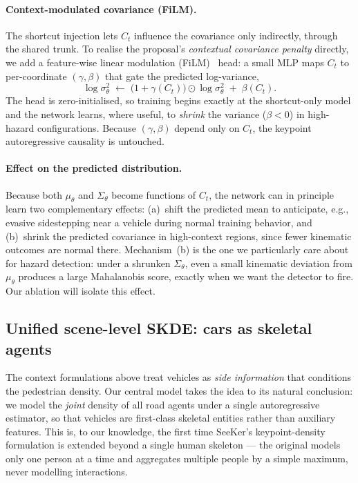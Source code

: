 \documentclass{article}
\begin{document}
\paragraph{Context-modulated covariance (FiLM).}
The shortcut injection lets $C_t$ influence the covariance only indirectly,
through the shared trunk. To realise the proposal's \emph{contextual
covariance penalty} directly, we add a feature-wise linear modulation
(FiLM)~\citep{perez2018film} head: a small MLP maps $C_t$ to per-coordinate
$(\gamma,\beta)$ that gate the predicted log-variance,
\begin{equation}
\label{eq:film}
\log\sigma^2_{\theta} \;\leftarrow\; \big(1+\gamma(C_t)\big)\odot
\log\sigma^2_{\theta} \;+\; \beta(C_t).
\end{equation}
The head is zero-initialised, so training begins exactly at the
shortcut-only model and the network learns, where useful, to \emph{shrink}
the variance ($\beta<0$) in high-hazard configurations. Because $(\gamma,\beta)$
depend only on $C_t$, the keypoint autoregressive causality is untouched.

\paragraph{Effect on the predicted distribution.}
Because both $\mu_{\theta}$ and $\Sigma_{\theta}$ become functions of $C_t$, the
network can in principle learn two complementary effects: (a)~shift the
predicted mean to anticipate, e.g., evasive sidestepping near a vehicle
during normal training behavior, and (b)~shrink the predicted covariance in
high-context regions, since fewer kinematic outcomes are normal there.
Mechanism~(b) is the one we particularly care about for hazard detection:
under a shrunken $\Sigma_{\theta}$, even a small kinematic deviation
from $\mu_{\theta}$ produces a large Mahalanobis score, exactly when we
want the detector to fire. Our ablation will isolate this effect.

\subsection{Unified scene-level SKDE: cars as skeletal agents}
\label{ssec:scene}
The context formulations above treat vehicles as \emph{side information} that
conditions the pedestrian density. Our central model takes the idea to its
natural conclusion: we model the \emph{joint} density of all road agents under a
single autoregressive estimator, so that vehicles are first-class skeletal
entities rather than auxiliary features. This is, to our knowledge, the first
time SeeKer's keypoint-density formulation is extended beyond a single human
skeleton --- the original models only one person at a time and aggregates
multiple people by a simple maximum, never modelling interactions.
\end{document}
